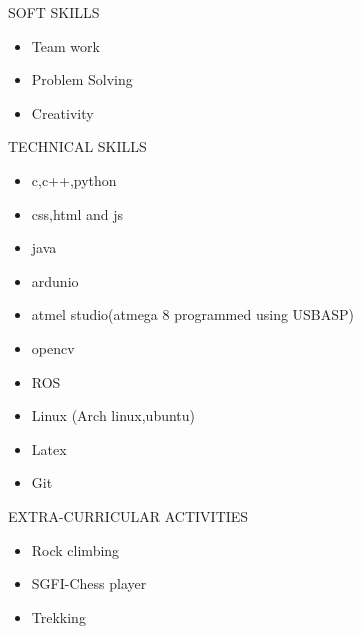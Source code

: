 \documentclass[10pt]{article}
\begin{document}
		\begin{minipage}[t][4cm][t]{0.2\textwidth}
		SOFT SKILLS
		
	\end{minipage}
	\begin{minipage}[t][4cm][t]{0.8\textwidth}
		\begin{itemize}
			\item Team work
			\item Problem Solving
			\item Creativity
		\end{itemize}
		
	\end{minipage}
	

		
	\begin{minipage}[t][8cm][t]{0.2\textwidth}
		TECHNICAL SKILLS
		
	\end{minipage}
	\begin{minipage}[t][8cm][t]{0.8\textwidth}
		\begin{itemize}
			\item c,c++,python
			\item css,html and js
			\item java
			\item ardunio
			\item atmel studio(atmega 8 programmed using USBASP)
			\item opencv
			\item ROS
			\item Linux (Arch linux,ubuntu)
			\item Latex
			\item Git
		\end{itemize}
		
	\end{minipage}




		



		
	\begin{minipage}[t][3cm][t]{0.2\textwidth}
		EXTRA-CURRICULAR ACTIVITIES
		
	\end{minipage}
	\begin{minipage}[t][3cm][t]{0.8\textwidth}
	\begin{itemize}
		\item Rock climbing
		\item SGFI-Chess player
		\item Trekking
	\end{itemize}
		
	\end{minipage}
\end{document}

